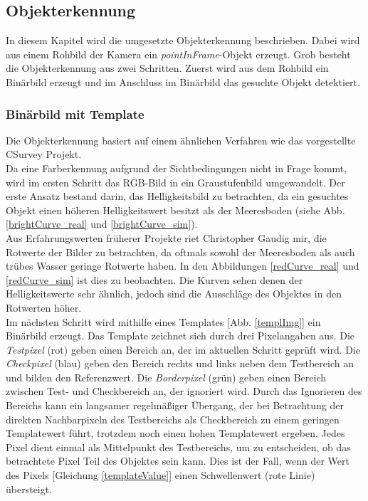 \subsection{Objekterkennung}
\label{sec_objDet}
In diesem Kapitel wird die umgesetzte Objekterkennung beschrieben. Dabei wird aus einem Rohbild der Kamera ein \textit{pointInFrame}-Objekt erzeugt. Grob besteht die Objekterkennung aus zwei Schritten. Zuerst wird aus dem Rohbild ein Binärbild erzeugt und im Anschluss im Binärbild das gesuchte Objekt detektiert.
\subsubsection{Binärbild mit Template}
\label{sec_templ}
Die Objekterkennung basiert auf einem ähnlichen Verfahren wie das vorgestellte CSurvey Projekt\cite{Albiez2015CSurveyA}.\\
Da eine Farberkennung aufgrund der Sichtbedingungen nicht in Frage kommt, wird im ersten Schritt das RGB-Bild in ein Graustufenbild umgewandelt. Der erste Ansatz bestand darin, das Helligkeitsbild zu betrachten, da ein gesuchtes Objekt einen höheren Helligkeitswert besitzt als der Meeresboden (siehe Abb. \ref{brightCurve_real} und \ref{brightCurve_sim}).\\
Aus Erfahrungswerten früherer Projekte riet Christopher Gaudig mir, die Rotwerte der Bilder zu betrachten, da oftmals sowohl der Meeresboden als auch trübes Wasser geringe Rotwerte haben. In den Abbildungen \ref{redCurve_real} und \ref{redCurve_sim} ist dies zu beobachten. Die Kurven sehen denen der Helligkeitswerte sehr ähnlich, jedoch sind die Ausschläge des Objektes in den Rotwerten höher.\\
Im nächsten Schritt wird mithilfe eines Templates [Abb. \ref{templImg}] ein Binärbild erzeugt. Das Template zeichnet sich durch drei Pixelangaben aus. Die \textit{Testpixel} (rot) geben einen Bereich an, der im aktuellen Schritt geprüft wird. Die \textit{Checkpixel} (blau) geben den Bereich rechts und links neben dem Testbereich an und bilden den Referenzwert. Die \textit{Borderpixel} (grün) geben einen Bereich zwischen Test- und Checkbereich an, der ignoriert wird. Durch das Ignorieren des Bereichs kann ein langsamer regelmäßiger Übergang, der bei Betrachtung der direkten Nachbarpixeln des Testbereichs als Checkbereich zu einem geringen Templatewert führt, trotzdem noch einen hohen Templatewert ergeben. Jedes Pixel dient einmal als Mittelpunkt des Testbereichs, um zu entscheiden, ob das betrachtete Pixel Teil des Objektes sein kann. Dies ist der Fall, wenn der Wert des Pixels [Gleichung \ref{templateValue}] einen Schwellenwert (rote Linie) übersteigt.\\
